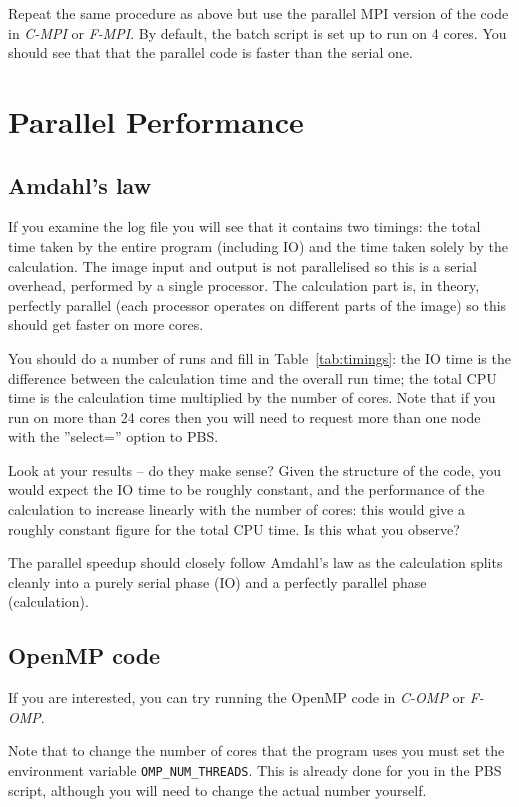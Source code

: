 \documentclass{article}
\begin{document}
Repeat the same procedure as above but use the parallel MPI version of
the code in \emph{C-MPI} or \emph{F-MPI}. By default, the batch
script is set up to run on 4 cores. You should see that that the
parallel code is faster than the serial one.

\section{Parallel Performance}

\subsection{Amdahl's law}

If you examine the log file you will see that it contains two timings:
the total time taken by the entire program (including IO) and the time
taken solely by the calculation. The image input and output is not
parallelised so this is a serial overhead, performed by a single
processor. The calculation part is, in theory, perfectly parallel
(each processor operates on different parts of the image) so this
should get faster on more cores.

You should do a number of runs and fill in Table~\ref{tab:timings}:
the IO time is the difference between the calculation time and the
overall run time; the total CPU time is the calculation time
multiplied by the number of cores. Note that if you run on more than
24 cores then you will need to request more than one node with the
''select='' option to PBS.

Look at your results -- do they make sense?  Given the structure of
the code, you would expect the IO time to be roughly constant, and the
performance of the calculation to increase linearly with the number of
cores: this would give a roughly constant figure for the total CPU
time. Is this what you observe?


The parallel speedup should closely follow Amdahl's law as the
calculation splits cleanly into a purely serial phase (IO) and a
perfectly parallel phase (calculation).

\subsection{OpenMP code}

If you are interested, you can try running the OpenMP code in
\emph{C-OMP} or \emph{F-OMP}.

Note that to change the number of cores that the program uses you must
set the environment variable \verb+OMP_NUM_THREADS+. This is already
done for you in the PBS script, although you will need to change the
actual number yourself.
\end{document}
